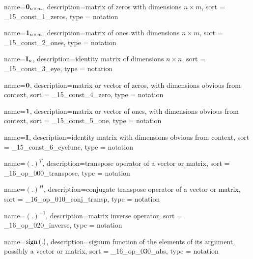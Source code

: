 
{
  name={\ensuremath{\zeros{n}{m}}},
  description={matrix of zeros with dimensions $n\times m$},
  sort = _15_const_1_zeros,
  type = notation
}

{
  name={\ensuremath{\ones{n}{m}}},
  description={matrix of ones with dimensions $n\times m$},
  sort = _15_const_2_ones,
  type = notation
}

{
  name={\ensuremath{\eye{n}}},
  description={identity matrix of dimensions $n\times n$},
  sort = _15_const_3_eye,
  type = notation
}

{
  name={\ensuremath{\zero}},
  description={matrix or vector of zeros, with dimensions obvious from context},
  sort = _15_const_4_zero,
  type = notation
}

{
  name={\ensuremath{\one}},
  description={matrix or vector of ones, with dimensions obvious from context},
  sort = _15_const_5_one,
  type = notation
}

{
  name={\ensuremath{\eyefunc}},
  description={identity matrix with dimensions obvious from context},
  sort = _15_const_6_eyefunc,
  type = notation
}


{
  name={\ensuremath{(.)^T}},
  description={transpose operator of a vector or matrix},
  sort = _16_op_000_transpose,
  type = notation
}

{
  name={\ensuremath{(.)^H}},
  description={conjugate transpose operator of a vector or matrix},
  sort = _16_op_010_conj_transp,
  type = notation
}

{
  name={\ensuremath{(.)^{-1}}},
  description={matrix inverse operator},
  sort = _16_op_020_inverse,
  type = notation
}

{
  name={\ensuremath{\sign{.}}},
  description={signum function of the elements of its argument, possibly a vector or matrix},
  sort = _16_op_030_abs,
  type = notation
}

